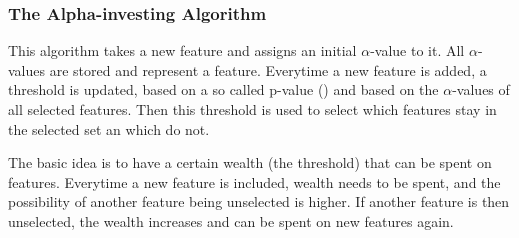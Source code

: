\subsubsection{The Alpha-investing Algorithm}
\label{sec:methods.streaming.alpha_investing}


This algorithm takes a new feature and assigns an initial $\alpha$-value to it.
All $\alpha$-values are stored and represent a feature. Everytime a new feature is
added, a threshold is updated, based on a so called p-value
(\cite{zhou2005learning}) and based on the $\alpha$-values of all selected
features. Then this threshold is used to select which features stay in the
selected set an which do not.

The basic idea is to have a certain wealth (the threshold) that can be spent on
features. Everytime a new feature is included, wealth needs to be spent, and the
possibility of another feature being unselected is higher. If another feature is
then unselected, the wealth increases and can be spent on new features again.
